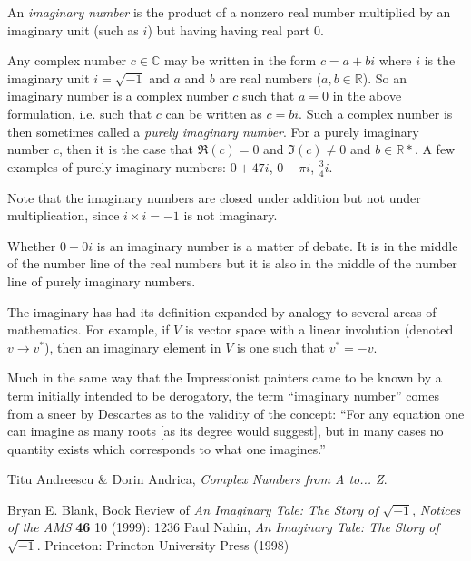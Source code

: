 \documentclass[12pt]{article}
\newcommand{\reals}{\mathbb{R}}
\begin{document}
An \emph{imaginary number} is the product of a nonzero real number multiplied by an imaginary unit (such as $i$) but having having real part 0.

Any complex number $c \in \mathbb{C}$ may be written in the form $c = a + b i$ where $i$ is the imaginary unit $i = \sqrt{-1}$ and $a$ and $b$ are real numbers ($a, b \in \reals$). So an imaginary number is a complex number $c$ such that $a = 0$ in the above formulation, i.e. such that $c$ can be written as $c = b i$. Such a complex number is then sometimes called a {\em purely imaginary number}. For a purely imaginary number $c$, then it is the case that $\Re(c) = 0$ and $\Im(c) \neq 0$ and $b \in \mathbb{R}*$.  A few examples of purely imaginary numbers: $0 + 47i$, $0 - \pi i$, $\frac{3}{4} i$.

Note that the imaginary numbers are closed under addition but not under multiplication, since $i \times i = -1$ is not imaginary.

Whether $0 + 0i$ is an imaginary number is a matter of debate. It is in the middle of the number line of the real numbers but it is also in the middle of the number line of purely imaginary numbers.

The  imaginary has had its definition expanded by analogy to several areas of mathematics.  For example, if $V$ is vector space with a linear involution (denoted $v\rightarrow v^*$), then an imaginary element in $V$ is one such that $v^* = -v$.

Much in the same way that the Impressionist painters came to be known by a term initially intended to be derogatory, the term ``imaginary number'' comes from a sneer by Descartes as to the validity of the concept: ``For any equation one can imagine as many roots [as its degree would suggest], but in many cases no quantity exists which corresponds to what one imagines.''

\begin{thebibliography}{2}
 Titu Andreescu \& Dorin Andrica, {\it Complex Numbers from A to... Z}.


 Bryan E. Blank, Book Review of {\it An Imaginary Tale: The Story of $\sqrt{-1}$}, {\it Notices of the AMS} {\bf 46} 10 (1999): 1236
 Paul Nahin, {\it An Imaginary Tale: The Story of $\sqrt{-1}$}. Princeton: Princton University Press (1998)
\end{thebibliography}
\end{document}
